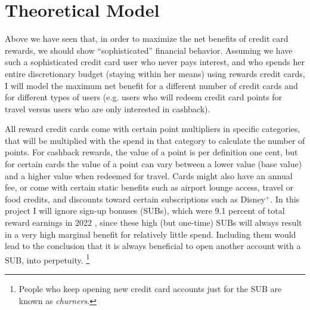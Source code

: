 \section{Theoretical Model} \label{sec:Theory}

Above we have seen that, in order to maximize the net benefits of credit card rewards, 
we should show ``sophisticated'' financial behavior.
Assuming we have such a sophisticated credit card user who never pays interest, and who spends her entire discretionary budget (staying within her means) using rewards credit cards, I will model the maximum net benefit for a different number of credit cards and for different types of users (e.g. users who will redeem credit card points for travel versus users who are only interested in cashback).

All reward credit cards come with certain point multipliers in specific categories, that will be multiplied with the spend in that category to calculate the number of points. 
For cashback rewards, the value of a point is per definition one cent, but for certain cards the value of a point can vary between a lower value (base value) and a higher value when redeemed for travel. 
Cards might also have an annual fee, or come with certain static benefits such as airport lounge access, travel or food credits, and discounts toward certain subscriptions such as Disney$^{+}$. 
In this project I will ignore sign-up bonuses (SUBs), which were 9.1 percent of total reward earnings in 2022 \citep{cfpb:2023}, since these high (but one-time) SUBs will always result in a very high marginal benefit for relatively little spend. Including them would  lead to the conclusion that it is always beneficial to open another account with a SUB, into perpetuity.%
\footnote{People who keep opening new credit card accounts just for the SUB are known as \emph{churners}.}  

